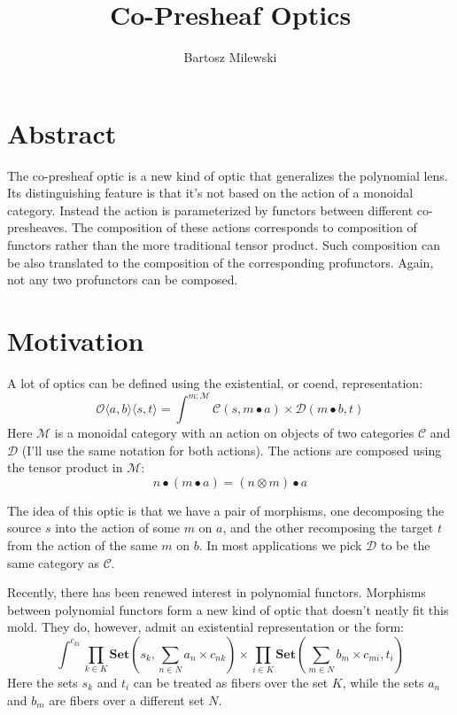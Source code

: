 \documentclass[11pt]{amsart}
\author{Bartosz Milewski}
\title{Co-Presheaf Optics}
\newcommand{\cat}[1]{\mathcal{#1}}%
\begin{document}
\maketitle{}

\section{Abstract}

The co-presheaf optic is a new kind of optic that generalizes the polynomial lens. Its distinguishing feature is that it's not based on the action of a monoidal category. Instead the action is parameterized by functors between different co-presheaves. The composition of these actions corresponds to composition of functors rather than the more traditional tensor product. Such composition can be also translated to the composition of the corresponding profunctors. Again, not any two profunctors can be composed. 

\section{Motivation}

A lot of optics can be defined using the existential, or coend, representation:
\[ \mathcal{O}\langle a, b\rangle \langle s, t \rangle = \int^{m \colon \cat M} \cat C (s, m \bullet a) \times \cat D ( m \bullet b, t) \]
Here $\cat M$ is a monoidal category with an action on objects of two categories $\cat C$ and $\cat D$ (I'll use the same notation for both actions). The actions are composed using the tensor product in $\cat M$:
\[ n \bullet (m \bullet a) = (n \otimes m) \bullet a \]

The idea of this optic is that we have a pair of morphisms, one decomposing the source $s$ into the action of some $m$ on $a$, and the other recomposing the target $t$ from the action of the same $m$ on $b$. In most applications we pick $\cat D$ to be the same category as $\cat C$.

Recently, there has been renewed interest in polynomial functors. Morphisms between polynomial functors form a new kind of optic that doesn't neatly fit this mold. They do, however, admit an existential representation or the form:
\[ \int^{c_{k i}} 
 \prod_{k \in K} \mathbf{Set} \left(s_k,  \sum_{n \in N} a_n \times c_{n k} \right) \times 
 \prod_{i \in K}  \mathbf{Set} \left(\sum_{m \in N} b_m \times c_{m i}, t_i \right) \]
Here the sets $s_k$ and $t_i$ can be treated as fibers over the set $K$, while the sets $a_n$ and $b_m$ are fibers over a different set $N$. 
\end{document}
